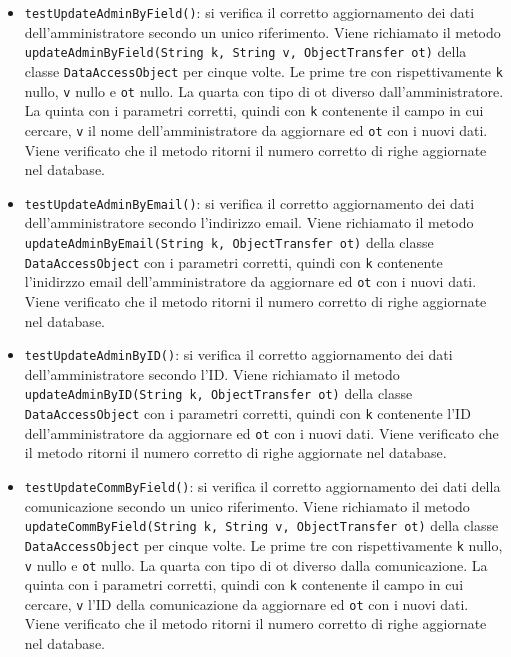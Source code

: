 {{\begin{itemize}
\begin{itemize}
\begin{itemize}
						\item \texttt{testUpdateAdminByField()}: si verifica il corretto aggiornamento dei dati dell'amministratore secondo un unico riferimento. Viene richiamato il metodo \newline \texttt{updateAdminByField(String k, String v, ObjectTransfer ot)} \newline della classe \texttt{DataAccessObject} per cinque volte. Le prime tre con rispettivamente \texttt{k} nullo, \texttt{v} nullo e \texttt{ot} nullo. La quarta con tipo di ot diverso dall'amministratore. La quinta con i parametri corretti, quindi con \texttt{k} contenente il campo in cui cercare, \texttt{v} il nome dell'amministratore da aggiornare ed \texttt{ot} con i nuovi dati. Viene verificato che il metodo ritorni il numero corretto di righe aggiornate nel database.
						
						\item \texttt{testUpdateAdminByEmail()}: si verifica il corretto aggiornamento dei dati dell'amministratore secondo l'indirizzo email. Viene richiamato il metodo \texttt{updateAdminByEmail(String k, ObjectTransfer ot)} della classe \texttt{DataAccessObject} con i parametri corretti, quindi con \texttt{k} contenente l'inidirzzo email dell'amministratore da aggiornare ed \texttt{ot} con i nuovi dati. Viene verificato che il metodo ritorni il numero corretto di righe aggiornate nel database.
						
						\item \texttt{testUpdateAdminByID()}: si verifica il corretto aggiornamento dei dati dell'amministratore secondo l'ID. Viene richiamato il metodo \newline \texttt{updateAdminByID(String k, ObjectTransfer ot)} della classe \newline \texttt{DataAccessObject} con i parametri corretti, quindi con \texttt{k} contenente l'ID dell'amministratore da aggiornare ed \texttt{ot} con i nuovi dati. Viene verificato che il metodo ritorni il numero corretto di righe aggiornate nel database.
						
						\item \texttt{testUpdateCommByField()}: si verifica il corretto aggiornamento dei dati della comunicazione secondo un unico riferimento. Viene richiamato il metodo \newline \texttt{updateCommByField(String k, String v, ObjectTransfer ot)} \newline della classe \texttt{DataAccessObject} per cinque volte. Le prime tre con rispettivamente \texttt{k} nullo, \texttt{v} nullo e \texttt{ot} nullo. La quarta con tipo di ot diverso dalla comunicazione. La quinta con i parametri corretti, quindi con \texttt{k} contenente il campo in cui cercare, \texttt{v} l'ID della comunicazione da aggiornare ed \texttt{ot} con i nuovi dati. Viene verificato che il metodo ritorni il numero corretto di righe aggiornate nel database.
						

\end{itemize}
\end{itemize}
\end{itemize}}}
